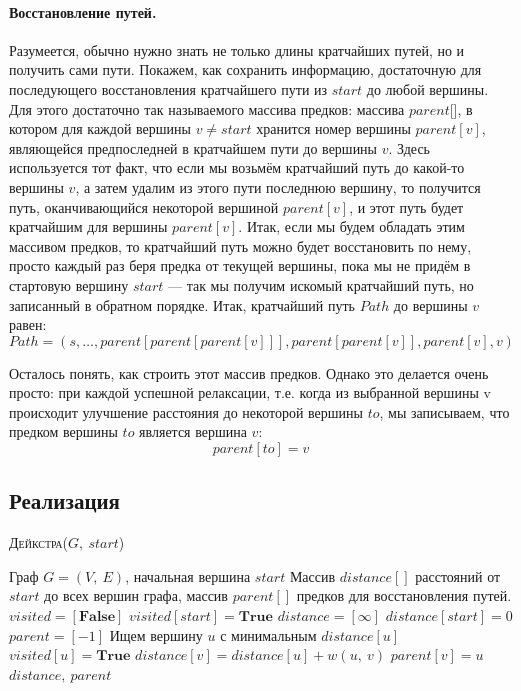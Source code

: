 \documentclass[a4paper,12pt]{article}
\newcommand{\algname}[1]{\textsc{#1}}
\begin{document}
\paragraph{Восстановление путей.}
Разумеется, обычно нужно знать не только длины кратчайших путей, но и получить сами пути. Покажем, как сохранить информацию, достаточную для последующего восстановления кратчайшего пути из $start$ до любой вершины. Для этого достаточно так называемого массива предков: массива $parent$[], в котором для каждой вершины $v \neq start$ хранится номер вершины $parent[v]$, являющейся предпоследней в кратчайшем пути до вершины $v$. Здесь используется тот факт, что если мы возьмём кратчайший путь до какой-то вершины $v$, а затем удалим из этого пути последнюю вершину, то получится путь, оканчивающийся некоторой вершиной $parent[v]$, и этот путь будет кратчайшим для вершины $parent[v]$. Итак, если мы будем обладать этим массивом предков, то кратчайший путь можно будет восстановить по нему, просто каждый раз беря предка от текущей вершины, пока мы не придём в стартовую вершину $start$ — так мы получим искомый кратчайший путь, но записанный в обратном порядке. Итак, кратчайший путь $Path$ до вершины $v$ равен:\[ Path = (s, \ldots, parent[parent[parent[v]]], parent[parent[v]], parent[v], v) \]

Осталось понять, как строить этот массив предков. Однако это делается очень просто: при каждой успешной релаксации, т.е. когда из выбранной вершины v происходит улучшение расстояния до некоторой вершины $to$, мы записываем, что предком вершины $to$ является вершина $v$:\[ parent[to] = v\] 

\subsection{Реализация}

\begin{algorithm}
  	\caption{\algname{Дейкстра}($G,\ start$)}
	\begin{algorithmic}
	    \Require Граф $G = (V,\ E)$, начальная вершина $start$
	    \Ensure Массив $distance[]$ расстояний от $start$ до всех вершин графа, массив $parent[]$ предков для восстановления путей.
	    \State 
	    \State $visited = [\textbf{False}]$
	    \State $visited[start] = \textbf{True}$
	    \State $distance = [\infty]$
	    \State $distance[start] = 0$
	    \State $parent = [-1]$
	        \State Ищем вершину $u$ с минимальным $distance[u]$
	            \State \Return{}
	        \Else
	            \State $visited[u] = \textbf{True}$
	                    \State $distance[v] = distance[u] + w(u,\ v)$
	                    \State $parent[v] = u$
	                \EndIf
	           \EndFor
	       \EndIf
	   \EndFor
	   \Return $distance,\ parent$
	\end{algorithmic}
\end{algorithm}
\end{document}
